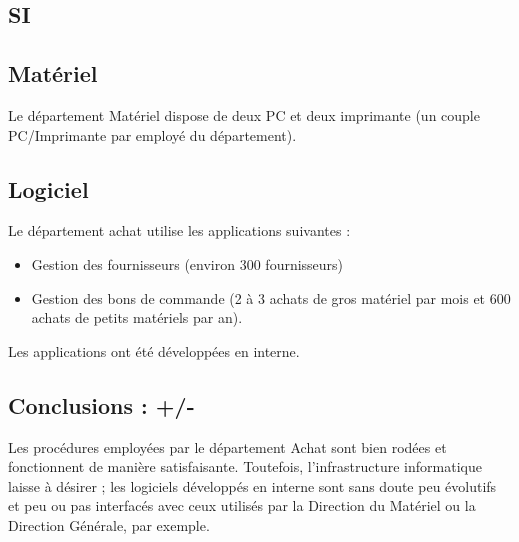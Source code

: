 \subsection{SI}

\subsection{Matériel}
Le département Matériel dispose de deux PC et deux imprimante (un couple
PC/Imprimante par employé du département).

\subsection{Logiciel}
Le département achat utilise les applications suivantes :
\begin{itemize}
\item Gestion des fournisseurs (environ 300 fournisseurs)
\item Gestion des bons de commande (2 à 3 achats de gros matériel par mois
et 600 achats de petits matériels par an).
\end{itemize}

Les applications ont été développées en interne.


\subsection{Conclusions : +/-}

Les procédures employées par le département Achat sont bien rodées et
fonctionnent de manière satisfaisante. Toutefois, l'infrastructure
informatique laisse à désirer ; les logiciels développés en interne sont
sans doute peu évolutifs et peu ou pas interfacés avec ceux utilisés par la
Direction du Matériel ou la Direction Générale, par exemple.


